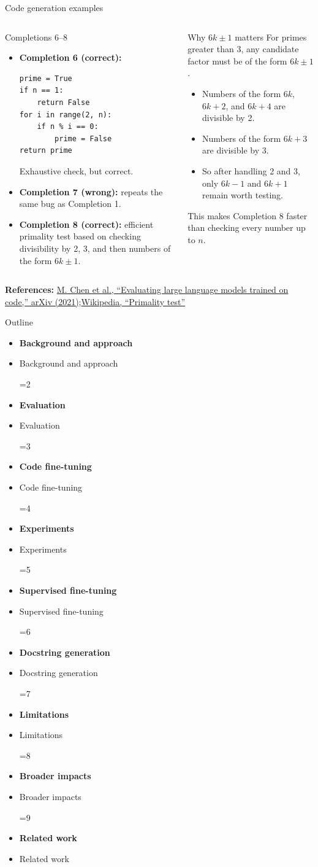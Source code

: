 \documentclass[aspectratio=43,9pt]{beamer}
\newcommand{\srclink}[2]{\href{#2}{\textcolor{black!68}{#1}}}
\newcommand{\sep}{;\hspace{0.35em}}
\newcommand{\refline}[2][References]{%
  \vfill
  {\raggedright\fontsize{5.1}{5.5}\selectfont\color{black!68}\textbf{#1:} #2\par}%
}
\newcommand{\srcChen}{\srclink{M. Chen et al., ``Evaluating large language models trained on code,'' arXiv (2021)}{https://arxiv.org/abs/2107.03374}}
\newcommand{\srcPrime}{\srclink{Wikipedia, ``Primality test''}{https://en.wikipedia.org/wiki/Primality_test}}
\newcommand{\outlineitem}[2]{%
  \ifnum\currentstage=#1\relax
    \item[{\textcolor{black}{\large\textbullet}}] {\color{black}\bfseries #2}
  \else
    \item[{\textcolor{black}{\large\textbullet}}] {\color{black!70}#2}
  \fi
}
\newcommand{\outlineframe}[1]{%
\begin{frame}{Outline}
\small
\def\currentstage{#1}
\begin{itemize}
  \setlength{\itemsep}{0.45em}
  \outlineitem{1}{Background and approach}
  \outlineitem{2}{Evaluation}
  \outlineitem{3}{Code fine-tuning}
  \outlineitem{4}{Experiments}
  \outlineitem{5}{Supervised fine-tuning}
  \outlineitem{6}{Docstring generation}
  \outlineitem{7}{Limitations}
  \outlineitem{8}{Broader impacts}
  \outlineitem{9}{Related work}
\end{itemize}
\end{frame}
}
\begin{document}
\begin{frame}[fragile]{Code generation examples}
\tiny
\begin{columns}[T,totalwidth=\textwidth]
\begin{block}{Completions 6--8}
\begin{itemize}
  \item \textbf{Completion 6 (correct):}
\begin{lstlisting}
prime = True
if n == 1:
    return False
for i in range(2, n):
    if n % i == 0:
        prime = False
return prime
\end{lstlisting}
Exhaustive check, but correct.
  \item \textbf{Completion 7 (wrong):} repeats the same bug as Completion 1.
  \item \textbf{Completion 8 (correct):} efficient primality test based on checking divisibility by 2, 3, and then numbers of the form \(6k\pm 1\).
\end{itemize}
\end{block}

\begin{block}{Why \(6k \pm 1\) matters}
For primes greater than 3, any candidate factor must be of the form \(6k \pm 1\).
\begin{itemize}
  \item Numbers of the form \(6k\), \(6k+2\), and \(6k+4\) are divisible by 2.
  \item Numbers of the form \(6k+3\) are divisible by 3.
  \item So after handling 2 and 3, only \(6k-1\) and \(6k+1\) remain worth testing.
\end{itemize}
This makes Completion 8 faster than checking every number up to \(n\).
\end{block}
\end{columns}

\refline{\srcChen\sep \srcPrime}
\end{frame}

\outlineframe{5}
\end{document}
